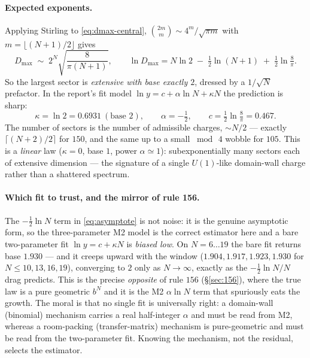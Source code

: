 \documentclass[11pt]{article}
\begin{document}
\paragraph{Expected exponents.} Applying Stirling to \eqref{eq:dmax-central},
$\binom{2m}{m}\sim 4^m/\sqrt{\pi m}$ with $m=\lfloor(N+1)/2\rfloor$ gives
\begin{equation}
  D_{\max}\;\sim\;2^{N}\sqrt{\frac{8}{\pi (N+1)}},
  \qquad
  \ln D_{\max}=N\ln 2\;-\;\tfrac12\ln (N+1)\;+\;\tfrac12\ln\tfrac{8}{\pi}.
  \label{eq:asymptote}
\end{equation}
So the largest sector is \emph{extensive with base exactly $2$}, dressed by a
$1/\sqrt N$ prefactor. In the report's fit model $\ln y=c+\alpha\ln N+\kappa N$
the prediction is sharp:
\begin{equation}
  \kappa=\ln 2=0.6931\ (\text{base }2),\qquad
  \alpha=-\tfrac12,\qquad
  c=\tfrac12\ln\tfrac{8}{\pi}=0.467.
\end{equation}
The number of sectors is the number of admissible charges, $\sim N/2$ ---
exactly $\lceil (N+2)/2\rceil$ for $150$, and the same up to a small
$\bmod\,4$ wobble for $105$. This is a \emph{linear} law ($\kappa=0$, base $1$,
power $\alpha\simeq1$): subexponentially many sectors each of extensive
dimension --- the signature of a single $U(1)$-like domain-wall charge rather
than a shattered spectrum.

\paragraph{Which fit to trust, and the mirror of rule 156.} The $-\tfrac12\ln N$
term in \eqref{eq:asymptote} is not noise: it is the genuine asymptotic form, so
the three-parameter M2 model is the correct estimator here and a bare
two-parameter fit $\ln y=c+\kappa N$ is \emph{biased low}. On $N=6\ldots19$ the
bare fit returns base $1.930$ --- and it creeps upward with the window
($1.904,1.917,1.923,1.930$ for $N\le 10,13,16,19$), converging to $2$ only as
$N\to\infty$, exactly as the $-\tfrac12\ln N/N$ drag predicts. This is the
precise \emph{opposite} of rule $156$ (\S\ref{sec:156}), where the true law is a
pure geometric $b^N$ and it is the M2 $\alpha\ln N$ term that spuriously eats the
growth. The moral is that no single fit is universally right: a domain-wall
(binomial) mechanism carries a real half-integer $\alpha$ and must be read from
M2, whereas a room-packing (transfer-matrix) mechanism is pure-geometric and
must be read from the two-parameter fit. Knowing the mechanism, not the residual,
selects the estimator.
\end{document}
